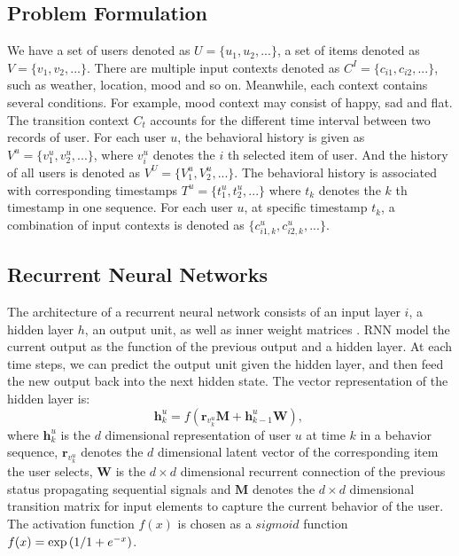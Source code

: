 \documentclass{sig-alternate}
\begin{document}
\subsection{Problem Formulation}
We have a set of users denoted as $U  = \{ u_1 ,u_2 ,...\}$, a set of items denoted as $V  = \{ v_1 ,v_2 ,...\}$. There are multiple input contexts denoted as $C^I = \{c_{i1} ,c_{i2} ,...\}$, such as weather, location, mood and so on. Meanwhile, each context contains several conditions. For example, mood context may consist of happy, sad and flat. The transition context $C_t$ accounts for the different time interval between two records of user. For each user $u$, the behavioral history is given as $V^u = \{v^u_{1}, v^u_{2}, ...\}$, where $v^u_{i}$ denotes the $i$ th selected item of user. And the history of all users is denoted as $V^U = \{V^u_{1}, V^u_{2}, ...\}$. The behavioral history is associated with corresponding timestamps $T^u = \{t^u_{1}, t^u_{2}, ...\}$ where $t_k$ denotes the $k$ th timestamp in one sequence. For each user $u$, at specific timestamp $t_k$, a combination of input contexts is denoted as $\{
c_{i1,k}^{u},c_{i2,k}^{u},...\}$.


\subsection{ Recurrent Neural Networks}
The architecture of a recurrent neural network consists of an input layer $i$, a hidden layer $h$, an output unit, as well as inner weight matrices \cite{zhang2014sequential}. RNN model the current output as the function of the previous output and a hidden layer. At each time steps, we can predict the output unit given the hidden layer, and then feed the new output back into the next hidden state. The vector representation of the hidden layer is:
\begin{equation}
\mathbf{h}_{k}^{u}=f\left ( {\mathbf{r}_{v_{k}^{u}}}\mathbf{M}+\mathbf{h}_{k-1}^{u}\mathbf{W} \right),~
\end{equation}
where $\mathbf{h}^u_{k}$ is the $d$ dimensional representation of  user $u$ at time $k$ in a behavior sequence, $\mathbf{r}_{v_{k}^{u}}$ denotes the $d$ dimensional latent vector of the corresponding item the user selects, $\mathbf{W}$ is the $d \times d$ dimensional recurrent connection of the previous status propagating sequential signals and $\mathbf{M}$ denotes the $d \times d$ dimensional transition matrix for input elements to capture the current behavior of the user. The activation function $f(x)$ is chosen as a $sigmoid$ function $f(x) = \exp \left( {1 \mathord{\left/ \right. \kern-\nulldelimiterspace} 1 + e^{ - x} } \right)$.
\end{document}
